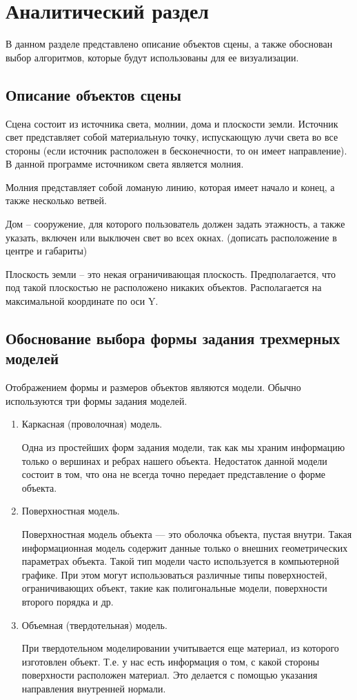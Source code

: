 \chapter{Аналитический раздел}
В данном разделе представлено описание объектов сцены, а также обоснован выбор алгоритмов, которые будут использованы для ее визуализации. 

\section{Описание объектов сцены}

Сцена состоит из источника света, молнии, дома и плоскости земли.
Источник свет представляет собой материальную точку, испускающую лучи света во все стороны (если источник расположен в бесконечности, то он имеет направление). В данной программе источником света является молния.

Молния представляет собой ломаную линию, которая имеет начало и конец, а также несколько ветвей. 

Дом -- сооружение, для которого пользователь должен задать этажность, а также указать, включен или выключен свет во всех окнах. (дописать расположение в центре и габариты)

Плоскость земли – это некая ограничивающая плоскость. Предполагается, что под такой плоскостью не расположено никаких объектов. Располагается на максимальной координате по оси Y. 


\section{Обоснование выбора формы задания трехмерных моделей}
Отображением формы и размеров объектов являются модели. 
Обычно используются три формы задания моделей.

\begin{enumerate}
	\item Каркасная (проволочная) модель.
	
	Одна из простейших форм задания модели, так как мы храним информацию только о вершинах и ребрах нашего объекта. Недостаток данной модели состоит в том, что она не всегда точно передает представление о форме объекта.
	
	\item Поверхностная модель.
	
	Поверхностная модель объекта — это оболочка объекта, пустая внутри. Такая информационная модель содержит данные только о внешних геометрических параметрах объекта. Такой тип модели часто используется в компьютерной графике. При этом могут использоваться различные типы поверхностей, ограничивающих объект, такие как полигональные модели, поверхности второго порядка и др.
	
	\item  Объемная (твердотельная) модель.
	
	При твердотельном моделировании учитывается еще материал, из которого изготовлен объект. Т.е. у нас есть информация о том, с какой стороны поверхности расположен материал. Это делается с помощью указания направления внутренней нормали.

\end{enumerate}

